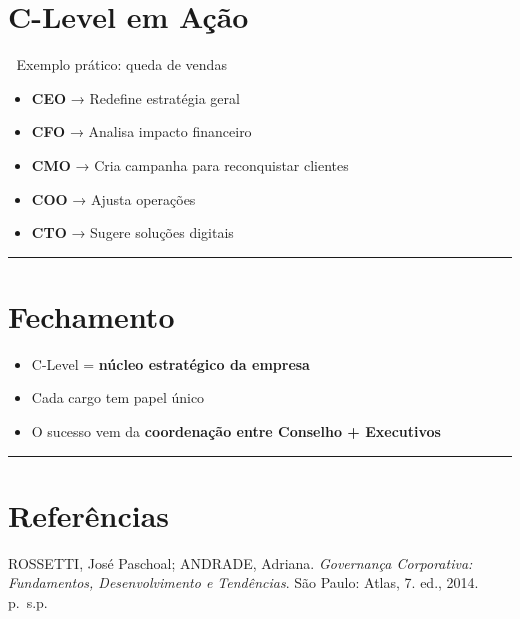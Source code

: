 \documentclass[
]{book}
\providecommand{\tightlist}{%
  \setlength{\itemsep}{0pt}\setlength{\parskip}{0pt}}
\begin{document}
\section{C-Level em Ação}\label{c-level-em-auxe7uxe3o}

📌 Exemplo prático: queda de vendas

\begin{itemize}
\tightlist
\item
  \textbf{CEO} → Redefine estratégia geral\\
\item
  \textbf{CFO} → Analisa impacto financeiro\\
\item
  \textbf{CMO} → Cria campanha para reconquistar clientes\\
\item
  \textbf{COO} → Ajusta operações\\
\item
  \textbf{CTO} → Sugere soluções digitais
\end{itemize}

\begin{center}\rule{0.5\linewidth}{0.5pt}\end{center}

\section{Fechamento}\label{fechamento}

\begin{itemize}
\tightlist
\item
  C-Level = \textbf{núcleo estratégico da empresa}\\
\item
  Cada cargo tem papel único\\
\item
  O sucesso vem da \textbf{coordenação entre Conselho + Executivos}
\end{itemize}

\begin{center}\rule{0.5\linewidth}{0.5pt}\end{center}

\section{Referências}\label{referuxeancias-3}

ROSSETTI, José Paschoal; ANDRADE, Adriana. \emph{Governança Corporativa: Fundamentos, Desenvolvimento e Tendências}. São Paulo: Atlas, 7. ed., 2014. p.~s.p.
\end{document}
